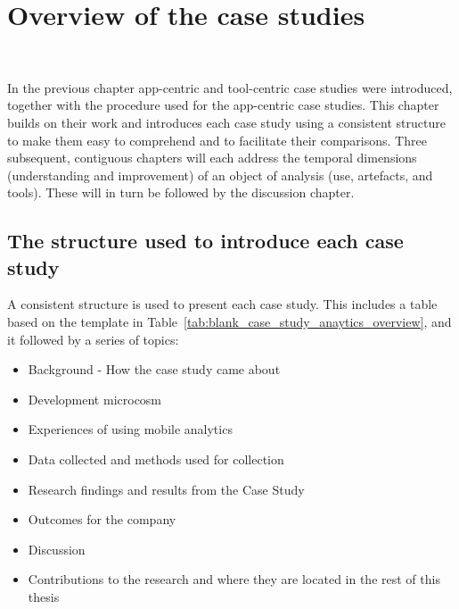 \chapter{Overview of the case studies}~\label{chapter-case-studies-overview}

In the previous chapter app-centric and tool-centric case studies were introduced, together with the procedure used for the app-centric case studies. This chapter builds on their work and introduces each case study using a consistent structure to make them easy to comprehend and to facilitate their comparisons. Three subsequent, contiguous chapters will each address the temporal dimensions (understanding and improvement) of an object of analysis (use, artefacts, and tools). These will in turn be followed by the discussion chapter.


\section{The structure used to introduce each case study}
A consistent structure is used to present each case study. This includes a table based on the template in Table~\ref{tab:blank_case_study_anaytics_overview}, and it followed by a series of topics:
\begin{itemize}
    \itemsep0em
    \item Background - How the case study came about
    \item Development microcosm
    \item Experiences of using mobile analytics
    \item Data collected and methods used for collection
    \item Research findings and results from the Case Study
    \item Outcomes for the company
    \item Discussion
    \item Contributions to the research and where they are located in the rest of this thesis
\end{itemize}



